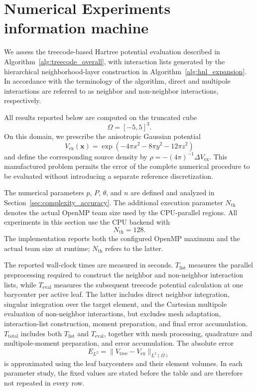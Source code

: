 \documentclass[a4paper,10pt]{article}
\begin{document}
\section{Numerical Experiments \color{red} information machine}
\label{sec:numerical_experiments}

We assess the treecode-based Hartree potential evaluation described in
Algorithm~\ref{alg:treecode_overall}, with interaction lists generated by
the hierarchical neighborhood-layer construction in
Algorithm~\ref{alg:hnl_expansion}.  In accordance with the terminology of
the algorithm, direct and multipole interactions are referred to as
neighbor and non-neighbor interactions, respectively.

All results reported below are computed on the truncated cube
\[
\Omega=[-5,5]^3.
\]
On this domain, we prescribe the anisotropic Gaussian potential
\[
V_{\mathrm{ex}}(\mathbf{x})
=\exp\!\left(-4\pi x^2-8\pi y^2-12\pi z^2\right)
\]
and define the corresponding source density by
\(\rho=-(4\pi)^{-1}\Delta V_{\mathrm{ex}}\).  This manufactured problem
permits the error of the complete numerical procedure to be evaluated
without introducing a separate reference discretization.

The numerical parameters \(p\), \(P\), \(\theta\), and \(n\) are defined
and analyzed in Section~\ref{sec:complexity_accuracy}.  The additional execution parameter
\(N_{\mathrm{th}}\) denotes the actual OpenMP team size used by the
CPU-parallel regions.  All experiments in this section use the CPU backend
with
\[
N_{\mathrm{th}}=128.
\]
The implementation reports both the configured OpenMP maximum and the
actual team size at runtime; \(N_{\mathrm{th}}\) refers to the latter.

The reported wall-clock times are measured in seconds.
\(T_{\mathrm{list}}\) measures the parallel preprocessing required to
construct the neighbor and non-neighbor interaction lists, while
\(T_{\mathrm{eval}}\) measures the subsequent treecode potential
calculation at one barycenter per active leaf.  The latter includes direct
neighbor integration, singular integration over the target element, and
the Cartesian multipole evaluation of non-neighbor interactions, but
excludes mesh adaptation, interaction-list construction, moment
preparation, and final error accumulation.  \(T_{\mathrm{total}}\) includes
both \(T_{\mathrm{list}}\) and \(T_{\mathrm{eval}}\), together with mesh
processing, quadrature and multipole-moment preparation, and error
accumulation.  The
absolute error
\[
E_{L^2}=\|V_{\mathrm{tree}}-V_{\mathrm{ex}}\|_{L^2(\Omega)}
\]
is approximated using the leaf barycenters and their element volumes.
In each parameter study, the fixed values are stated before the table and
are therefore not repeated in every row.
\end{document}
